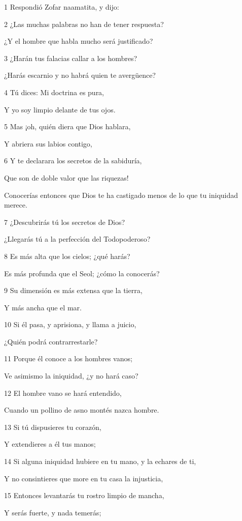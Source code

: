 \par 1 Respondió Zofar naamatita, y dijo:
\par 2 ¿Las muchas palabras no han de tener respuesta?
\par ¿Y el hombre que habla mucho será justificado?
\par 3 ¿Harán tus falacias callar a los hombres?
\par ¿Harás escarnio y no habrá quien te avergüence?
\par 4 Tú dices: Mi doctrina es pura,
\par Y yo soy limpio delante de tus ojos.
\par 5 Mas ¡oh, quién diera que Dios hablara,
\par Y abriera sus labios contigo,
\par 6 Y te declarara los secretos de la sabiduría,
\par Que son de doble valor que las riquezas!
\par Conocerías entonces que Dios te ha castigado menos de lo que tu iniquidad merece.
\par 7 ¿Descubrirás tú los secretos de Dios?
\par ¿Llegarás tú a la perfección del Todopoderoso?
\par 8 Es más alta que los cielos; ¿qué harás?
\par Es más profunda que el Seol; ¿cómo la conocerás?
\par 9 Su dimensión es más extensa que la tierra,
\par Y más ancha que el mar.
\par 10 Si él pasa, y aprisiona, y llama a juicio,
\par ¿Quién podrá contrarrestarle?
\par 11 Porque él conoce a los hombres vanos;
\par Ve asimismo la iniquidad, ¿y no hará caso?
\par 12 El hombre vano se hará entendido,
\par Cuando un pollino de asno montés nazca hombre.
\par 13 Si tú dispusieres tu corazón,
\par Y extendieres a él tus manos;
\par 14 Si alguna iniquidad hubiere en tu mano, y la echares de ti,
\par Y no consintieres que more en tu casa la injusticia,
\par 15 Entonces levantarás tu rostro limpio de mancha,
\par Y serás fuerte, y nada temerás;
